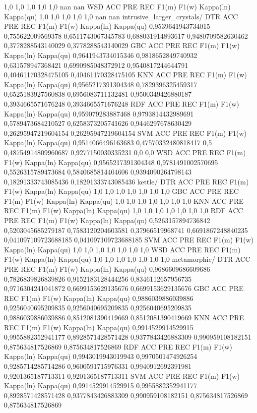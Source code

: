 1,0	1,0	1,0	1,0	1,0	nan	nan
WSD
ACC	PRE	REC	F1(m)	F1(w)	Kappa(ln)	Kappa(qu)
1,0	1,0	1,0	1,0	1,0	nan	nan
intrusive_larger_crystals/
DTR
ACC	PRE	REC	F1(m)	F1(w)	Kappa(ln)	Kappa(qu)
0,9539641943734015	0,755622009569378	0,6511743067345783	0,688031914893617	0,9480709582630462	0,3778288543140029	0,3778288543140029
GBC
ACC	PRE	REC	F1(m)	F1(w)	Kappa(ln)	Kappa(qu)
0,9641943734015346	0,9818652849740932	0,631578947368421	0,6990985048372912	0,9540817244644791	0,40461170328475105	0,40461170328475105
KNN
ACC	PRE	REC	F1(m)	F1(w)	Kappa(ln)	Kappa(qu)
0,9565217391304348	0,7829396325459317	0,6525183927560838	0,6956083711132481	0,9500349426880187	0,3934665571676248	0,3934665571676248
RDF
ACC	PRE	REC	F1(m)	F1(w)	Kappa(ln)	Kappa(qu)
0,959079283887468	0,9793814432989691	0,5789473684210527	0,6258373205741626	0,9446297678630429	0,26295947219604154	0,26295947219604154
SVM
ACC	PRE	REC	F1(m)	F1(w)	Kappa(ln)	Kappa(qu)
0,9514066496163683	0,47570332480818417	0,5	0,48754914809960687	0,9277150030335231	0,0	0,0
WSD
ACC	PRE	REC	F1(m)	F1(w)	Kappa(ln)	Kappa(qu)
0,9565217391304348	0,9781491002570695	0,5526315789473684	0,5840685814404606	0,9394090264798143	0,18291333743085436	0,18291333743085436
kettle/
DTR
ACC	PRE	REC	F1(m)	F1(w)	Kappa(ln)	Kappa(qu)
1,0	1,0	1,0	1,0	1,0	1,0	1,0
GBC
ACC	PRE	REC	F1(m)	F1(w)	Kappa(ln)	Kappa(qu)
1,0	1,0	1,0	1,0	1,0	1,0	1,0
KNN
ACC	PRE	REC	F1(m)	F1(w)	Kappa(ln)	Kappa(qu)
1,0	1,0	1,0	1,0	1,0	1,0	1,0
RDF
ACC	PRE	REC	F1(m)	F1(w)	Kappa(ln)	Kappa(qu)
0,5263157894736842	0,5203045685279187	0,7583120204603581	0,37966519968741	0,6691867248840235	0,041097109723688185	0,041097109723688185
SVM
ACC	PRE	REC	F1(m)	F1(w)	Kappa(ln)	Kappa(qu)
1,0	1,0	1,0	1,0	1,0	1,0	1,0
WSD
ACC	PRE	REC	F1(m)	F1(w)	Kappa(ln)	Kappa(qu)
1,0	1,0	1,0	1,0	1,0	1,0	1,0
metamorphic/
DTR
ACC	PRE	REC	F1(m)	F1(w)	Kappa(ln)	Kappa(qu)
0,9686609686609686	0,7826839826839826	0,9152183128444256	0,8346112657956735	0,9716304241041872	0,6699153629135676	0,6699153629135676
GBC
ACC	PRE	REC	F1(m)	F1(w)	Kappa(ln)	Kappa(qu)
0,9886039886039886	0,9256040695209835	0,9256040695209835	0,9256040695209835	0,9886039886039886	0,8512081390419669	0,8512081390419669
KNN
ACC	PRE	REC	F1(m)	F1(w)	Kappa(ln)	Kappa(qu)
0,9914529914529915	0,9955882352941177	0,8928571428571428	0,9377843426883309	0,990959108182151	0,875634817526869	0,875634817526869
RDF
ACC	PRE	REC	F1(m)	F1(w)	Kappa(ln)	Kappa(qu)
0,9943019943019943	0,9970501474926254	0,9285714285714286	0,9600591715976331	0,9940912692391981	0,9201365187713311	0,9201365187713311
SVM
ACC	PRE	REC	F1(m)	F1(w)	Kappa(ln)	Kappa(qu)
0,9914529914529915	0,9955882352941177	0,8928571428571428	0,9377843426883309	0,990959108182151	0,875634817526869	0,875634817526869
